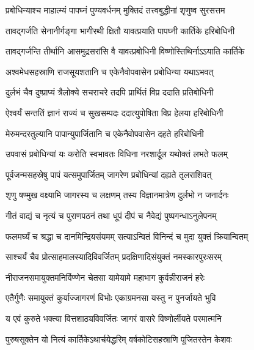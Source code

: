 


\twolineshloka
{प्रबोधिन्याश्च माहात्म्यं पापघ्नं पुण्यवर्धनम्}
{मुक्तिदं तत्त्वबुद्धीनां शृणुष्व सुरसत्तम} %

\twolineshloka
{तावद्गर्जति सेनानीर्गङ्गा भागीरथी क्षितौ}
{यावत्प्रयाति पापघ्नी कार्तिके हरिबोधिनी} %

\twolineshloka
{तावद्गर्जन्ति तीर्थानि आसमुद्रसरांसि वै}
{यावत्प्रबोधिनी विष्णोस्तिथिर्नाऽऽयाति कार्तिके} %

\twolineshloka
{अश्वमेधसहस्राणि राजसूयशतानि च}
{एकेनैवोपवासेन प्रबोधिन्या यथाऽभवत्} %

\twolineshloka
{दुर्लभं चैव दुष्प्राप्यं त्रैलोक्ये सचराचरे}
{तदपि प्रार्थितं विप्र ददाति प्रतिबोधिनी} %

\twolineshloka
{ऐश्वर्यं सन्ततिं ज्ञानं राज्यं च सुखसम्पदः}
{ददात्युपोषिता विप्र हेलया हरिबोधिनी} %

\twolineshloka
{मेरुमन्दरतुल्यानि पापान्युपार्जितानि च}
{एकेनैवोपवासेन दहते हरिबोधिनी} %

\twolineshloka
{उपवासं प्रबोधिन्यां यः करोति स्वभावतः}
{विधिना नरशार्दूल यथोक्तं लभते फलम्} %

\twolineshloka
{पूर्वजन्मसहस्रेषु पापं यत्समुपार्जितम्}
{जागरेण प्रबोधिन्यां दह्यते तृलराशिवत्} %

\twolineshloka
{शृणु षण्मुख वक्ष्यामि जागरस्य च लक्षणम्}
{तस्य विज्ञानमात्रेण दुर्लभो न जनार्दनः} %

\twolineshloka
{गीतं वाद्यं च नृत्यं च पुराणपठनं तथा}
{धूपं दीपं च नैवेद्यं पुष्पगन्धाऽनुलेपनम्} %

\twolineshloka
{फलमर्घ्यं च श्रद्धा च दानमिन्द्रियसंयमम्}
{सत्याऽन्वितं विनिन्दं च मुदा युक्तं क्रियान्वितम्} %

\twolineshloka
{साश्चर्यं चैव प्रोत्साहमालस्यादिविवर्जितम्}
{प्रदक्षिणादिसंयुक्तं नमस्कारपुरःसरम्} %

\twolineshloka
{नीराजनसमायुक्तमनिर्विण्णेन चेतसा}
{यामेयामे महाभाग कुर्वन्नीराजनं हरेः} %

\twolineshloka
{एतैर्गुणैः समायुक्तं कुर्याज्जागरणं विभोः}
{एकाग्रमनसा यस्तु न पुनर्जायते भुवि} %

\twolineshloka
{य एवं कुरुते भक्त्या वित्तशाठ्यविवर्जितः}
{जागरं वासरे विष्णोर्लीयते परमात्मनि} %

\twolineshloka
{पुरुषसूक्तेन यो नित्यं कार्तिकेऽथार्चयेद्धरिम्}
{वर्षकोटिसहस्राणि पूजितस्तेन केशवः} %

